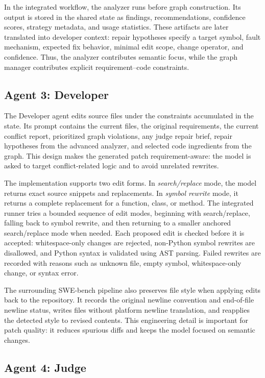 \documentclass[11pt]{article}
\begin{document}
In the integrated workflow, the analyzer runs before graph construction.  Its output is stored in the shared state as findings, recommendations, confidence scores, strategy metadata, and usage statistics.  These artifacts are later translated into developer context: repair hypotheses specify a target symbol, fault mechanism, expected fix behavior, minimal edit scope, change operator, and confidence.  Thus, the analyzer contributes semantic focus, while the graph manager contributes explicit requirement--code constraints.

\subsection{Agent 3: Developer}
\label{subsec:developer}

The Developer agent edits source files under the constraints accumulated in the state.  Its prompt contains the current files, the original requirements, the current conflict report, prioritized graph violations, any judge repair brief, repair hypotheses from the advanced analyzer, and selected code ingredients from the graph.  This design makes the generated patch requirement-aware: the model is asked to target conflict-related logic and to avoid unrelated rewrites.

The implementation supports two edit forms.  In \emph{search/replace} mode, the model returns exact source snippets and replacements.  In \emph{symbol rewrite} mode, it returns a complete replacement for a function, class, or method.  The integrated runner tries a bounded sequence of edit modes, beginning with search/replace, falling back to symbol rewrite, and then returning to a smaller anchored search/replace mode when needed.  Each proposed edit is checked before it is accepted: whitespace-only changes are rejected, non-Python symbol rewrites are disallowed, and Python syntax is validated using AST parsing.  Failed rewrites are recorded with reasons such as unknown file, empty symbol, whitespace-only change, or syntax error.

The surrounding SWE-bench pipeline also preserves file style when applying edits back to the repository.  It records the original newline convention and end-of-file newline status, writes files without platform newline translation, and reapplies the detected style to revised contents.  This engineering detail is important for patch quality: it reduces spurious diffs and keeps the model focused on semantic changes.

\subsection{Agent 4: Judge}
\label{subsec:judge}
\end{document}
